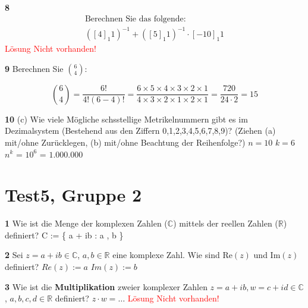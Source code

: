 \documentclass[11pt]{article}
\begin{document}
    \textbf{8} \[
                   \begin{gathered}
                       \text{Berechnen Sie das folgende:} \\
                       \left([4]_1 1\right)^{-1} + \left([5]_1 1\right)^{-1} \cdot [-10]_1 1
                   \end{gathered}
    \]\newline
    \textcolor{red}{Lösung Nicht vorhanden!}\newline

    \textbf{9} Berechnen Sie \(\binom{6}{4}\):

    \[
        \binom{6}{4} = \frac{6!}{4!(6-4)!} = \frac{6 \times 5 \times 4 \times 3 \times 2 \times 1}{4 \times 3 \times 2 \times 1 \times 2 \times 1} = \frac{720}{24 \cdot 2} = 15
    \]\newline


    \textbf{10} (c) Wie viele Mögliche schsstellige Metrikelnummern gibt es im Dezimalsystem (Bestehend aus den Ziffern {0,1,2,3,4,5,6,7,8,9})? (Ziehen (a) mit/ohne Zurücklegen, (b) mit/ohne Beachtung der Reihenfolge?)\newline
    $n = 10$\newline
    $k = 6$
    $n^{k}$ = $10^{6}$ = $1.000.000$

\section{Test5, Gruppe 2}

    \textbf{1} Wie ist die Menge der komplexen Zahlen (\(\mathbb{C}\)) mittels der reellen Zahlen (\(\mathbb{R}\)) definiert?\newline
    C := \{ a + ib : a \in {}, b \in {} \}\newline

    \textbf{2} Sei \( z = a + ib \in \mathbb{C} \), \( a,b \in \mathbb{R} \) eine komplexe Zahl. Wie sind \( \text{Re}(z) \) und \( \text{Im}(z) \) definiert?\newline
    $Re(z) := a$\newline
    $Im(z) := b$\newline

    \textbf{3} Wie ist die \textbf{Multiplikation} zweier komplexer Zahlen \( z = a + ib, w = c + id \in \mathbb{C} \), \( a,b,c,d \in \mathbb{R} \) definiert? \( z \cdot w = \ldots \)\newline
    \textcolor{red}{Lösung Nicht vorhanden!}\newline
\end{document}
